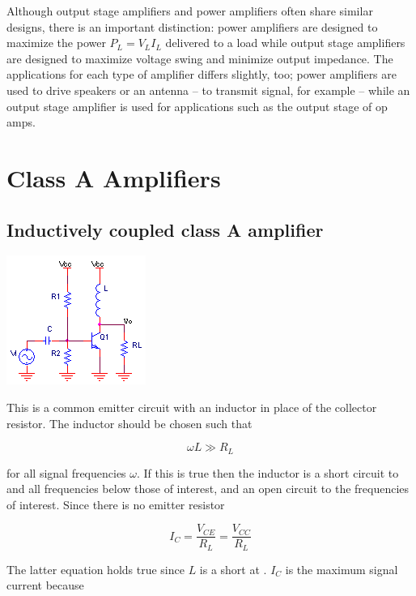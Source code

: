 Although output stage amplifiers and power amplifiers often share similar designs, there is an important distinction:
power amplifiers are designed to maximize the power $P_{L} = V_{L}I_{L}$ delivered to a load while output stage amplifiers are designed to maximize voltage swing and minimize output impedance.
The applications for each type of amplifier differs slightly, too;
power amplifiers are used to drive speakers or an antenna -- to transmit  signal, for example -- while an output stage amplifier is used for applications such as the output stage of op amps.

\section{Class A Amplifiers}

\subsection{Inductively coupled class A amplifier}
\begin{center}
		\includegraphics{schematics/inductivecommonemitter.png}
\end{center}
This is a common emitter circuit with an inductor in place of the collector resistor. The inductor should be chosen such that

\begin{equation}
\omega L \gg R_{L}
\end{equation}

for all signal frequencies $\omega$.
If this is true then the inductor is a short circuit to \DC and all frequencies below those of interest, and an open circuit to the frequencies of interest.
Since there is no emitter resistor

\begin{equation}
I_{C} = \frac{V_{CE}}{R_{L}} = \frac{V_{CC}}{R_{L}}
\end{equation}

The latter equation holds true since $L$ is a short at \DC.
$I_{C}$ is the maximum signal current because


